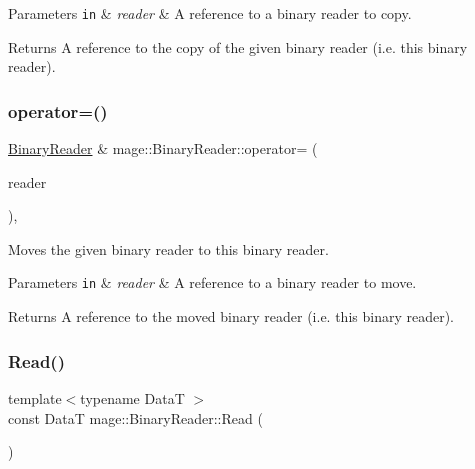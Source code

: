 \begin{DoxyParams}[1]{Parameters}
\mbox{\tt in}  & {\em reader} & A reference to a binary reader to copy. \\
\hline
\end{DoxyParams}
\begin{DoxyReturn}{Returns}
A reference to the copy of the given binary reader (i.\+e. this binary reader). 
\end{DoxyReturn}
\mbox{\label{classmage_1_1_binary_reader_a280998bb89dacdcb88ec87c49ce90a02}} 
\subsubsection{\texorpdfstring{operator=()}{operator=()}\hspace{0.1cm}{\footnotesize\ttfamily [2/2]}}
{\footnotesize\ttfamily \mbox{\hyperlink{classmage_1_1_binary_reader}{Binary\+Reader}} \& mage\+::\+Binary\+Reader\+::operator= (\begin{DoxyParamCaption}\item[{\mbox{\hyperlink{classmage_1_1_binary_reader}{Binary\+Reader}} \&\&}]{reader }\end{DoxyParamCaption})\hspace{0.3cm}{\ttfamily [default]}, {\ttfamily [noexcept]}}

Moves the given binary reader to this binary reader.


\begin{DoxyParams}[1]{Parameters}
\mbox{\tt in}  & {\em reader} & A reference to a binary reader to move. \\
\hline
\end{DoxyParams}
\begin{DoxyReturn}{Returns}
A reference to the moved binary reader (i.\+e. this binary reader). 
\end{DoxyReturn}
\mbox{\label{classmage_1_1_binary_reader_ad914ec3edfef7a9e9976ef706be44b92}} 
\subsubsection{\texorpdfstring{Read()}{Read()}}
{\footnotesize\ttfamily template$<$typename DataT $>$ \\
const DataT mage\+::\+Binary\+Reader\+::\+Read (\begin{DoxyParamCaption}{ }\end{DoxyParamCaption})\hspace{0.3cm}{\ttfamily [protected]}}

